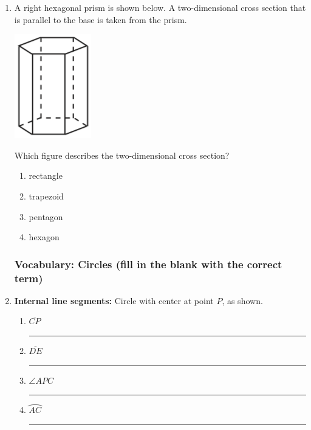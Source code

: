 \documentclass[12pt, twoside]{article}
\begin{document}
\begin{enumerate}
\item %
  A right hexagonal prism is shown below. A two-dimensional cross section that is parallel to the base is taken from the prism.
    \begin{center}
    \includegraphics[scale=0.4]{hex-prism_JA2018.png}
    \end{center}
   Which figure describes the two-dimensional cross section?
    \begin{multicols}{2}
      \begin{enumerate}
        \item rectangle
        \item trapezoid
        \item pentagon
        \item hexagon
      \end{enumerate}
    \end{multicols}

\newpage
\subsubsection*{Vocabulary: Circles (fill in the blank with the correct term)}

\item \textbf{Internal line segments:} Circle with center at point $P$, as shown.
    \begin{multicols}{2}
      \begin{enumerate}
        \item  $\overline{CP}$ \quad \rule{3cm}{0.15mm} %
        \item  $\overline{DE}$ \quad \rule{3cm}{0.15mm} %
        \item $\angle APC$ \quad \rule{3cm}{0.15mm} %
        \item  $\wideparen{AC}$ \quad \rule{3cm}{0.15mm} %
      \end{enumerate}
  \end{multicols}


\end{enumerate}
\end{document}
